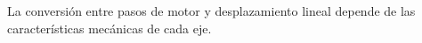 La conversión entre pasos de motor y desplazamiento lineal depende de las características mecánicas de cada eje.

